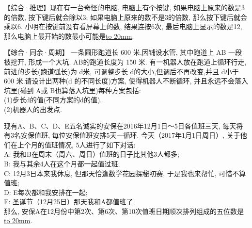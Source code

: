 \item {
    【综合·推理】现在有一台奇怪的电脑, 电脑上有个按键, 如果电脑上原来的数是3的倍数, 按下键后就会除以3; 如果电脑上原来的数不是3的倍数, 那么按下键后就会乘以6. 小明在按键前没有看屏幕上的数, 结果连按6次, 最后电脑上显示的数是12, 那么电脑上最开始的数最小可能是\underline{\hbox to 20mm{}}.
    \vspace{1cm}
}

\item {
    【综合·同余·周期】
    一条圆形跑道长 600 米,因铺设水管, 其中跑道上 AB 一段被挖开, 形成一个大坑. AB的跑道长度为 150 米.  有一机器人放在跑道上循环行走,  前进的步长(跑道弧长)为 d米, 可调整步长 d的大小,但调后不再改变,并且 d小于 600 米.请设计出两种(d 的不同长度)方案, 使得机器人不断循环, 并且永远不会落入坑里(碰到 A或 B也算落入坑里)每种方案包括:\\
    (1)步长d的值(不同方案的d的值). \\
    (2)机器人的出发点.
    \vspace{1cm}
}


\item {
    现有A、B、C、D、E五名诚实的安保在2016年12月1日～5日各值班三天, 每天将有3名安保值班, 每位安保值班安排5天一循环. 今天（2017年1月1日周日）, 关于他们在上个月的值班情况, 5人进行了如下对话: \\
    A: 我和B在周末（周六、周日）值班的日子比其他3人都多; \\
    B: 我与其余4人在这个月都一起值过班; \\
    C: 12月3日本来我休息, 但那天恰逢数学花园探秘初赛, 于是我也来帮忙, 可惜不算值班; \\
    D: E每次都和我安排在一起; \\
    E: 圣诞节（12月25日）那天我和A都值班了. \\
    那么, 安保A在12月份中第2次、第6次、第10次值班日期顺次排列组成的五位数是\underline{\hbox to 20mm{}}.
    \vspace{1cm}
}

